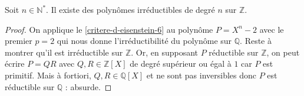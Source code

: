 
  \begin{application}
    Soit $n \in \mathbb{N}^*$. Il existe des polynômes irréductibles de degré $n$ sur $\mathbb{Z}$.
  \end{application}

  \begin{proof}
    On applique le \cref{critere-d-eisenstein-6} au polynôme $P = X^n - 2$ avec le premier $p = 2$ qui nous donne l'irréductibilité du polynôme sur $\mathbb{Q}$. Reste à montrer qu'il est irréductible sur $\mathbb{Z}$.
    \newpar
    Or, en supposant $P$ réductible sur $\mathbb{Z}$, on peut écrire $P = QR$ avec $Q, R \in \mathbb{Z}[X]$ de degré supérieur ou égal à $1$ car $P$ est primitif. Mais à fortiori, $Q, R \in \mathbb{Q}[X]$ et ne sont pas inversibles donc $P$ est réductible sur $\mathbb{Q}$ : absurde.
  \end{proof}

